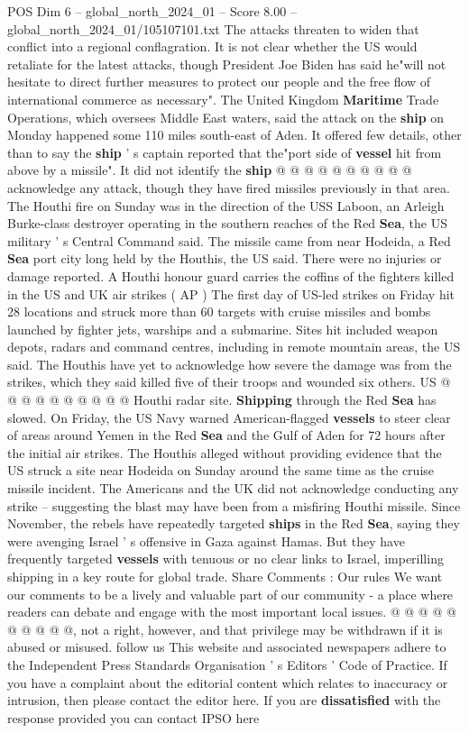 \begin{textsample}{POS Dim 6 – global\_north\_2024\_01 – Score 8.00 – global\_north\_2024\_01/105107101.txt}
The attacks threaten to widen that conflict into a regional conflagration.
It is not clear whether the US would retaliate for the latest attacks, though President Joe Biden has said he"will not hesitate to direct further measures to protect our people and the free flow of international commerce as necessary".
The United Kingdom \textbf{Maritime} Trade Operations, which oversees Middle East waters, said the attack on the \textbf{ship} on Monday happened some 110 miles south-east of Aden.
It offered few details, other than to say the \textbf{ship} ' s captain reported that the"port side of \textbf{vessel} hit from above by a missile".
It did not identify the \textbf{ship} @ @ @ @ @ @ @ @ @ @ acknowledge any attack, though they have fired missiles previously in that area.
The Houthi fire on Sunday was in the direction of the USS Laboon, an Arleigh Burke-class destroyer operating in the southern reaches of the Red \textbf{Sea}, the US military ' s Central Command said.
The missile came from near Hodeida, a Red \textbf{Sea} port city long held by the Houthis, the US said.
There were no injuries or damage reported.
A Houthi honour guard carries the coffins of the fighters killed in the US and UK air strikes ( AP ) The first day of US-led strikes on Friday hit 28 locations and struck more than 60 targets with cruise missiles and bombs launched by fighter jets, warships and a submarine.
Sites hit included weapon depots, radars and command centres, including in remote mountain areas, the US said.
The Houthis have yet to acknowledge how severe the damage was from the strikes, which they said killed five of their troops and wounded six others.
US @ @ @ @ @ @ @ @ @ @ Houthi radar site. \textbf{Shipping} through the Red \textbf{Sea} has slowed.
On Friday, the US Navy warned American-flagged \textbf{vessels} to steer clear of areas around Yemen in the Red \textbf{Sea} and the Gulf of Aden for 72 hours after the initial air strikes.
The Houthis alleged without providing evidence that the US struck a site near Hodeida on Sunday around the same time as the cruise missile incident.
The Americans and the UK did not acknowledge conducting any strike -- suggesting the blast may have been from a misfiring Houthi missile.
Since November, the rebels have repeatedly targeted \textbf{ships} in the Red \textbf{Sea}, saying they were avenging Israel ' s offensive in Gaza against Hamas.
But they have frequently targeted \textbf{vessels} with tenuous or no clear links to Israel, imperilling shipping in a key route for global trade.
Share Comments : Our rules We want our comments to be a lively and valuable part of our community - a place where readers can debate and engage with the most important local issues. @ @ @ @ @ @ @ @ @ @, not a right, however, and that privilege may be withdrawn if it is abused or misused. follow us This website and associated newspapers adhere to the Independent Press Standards Organisation ' s Editors ' Code of Practice.
If you have a complaint about the editorial content which relates to inaccuracy or intrusion, then please contact the editor here.
If you are \textbf{dissatisfied} with the response provided you can contact IPSO here


\end{textsample}
